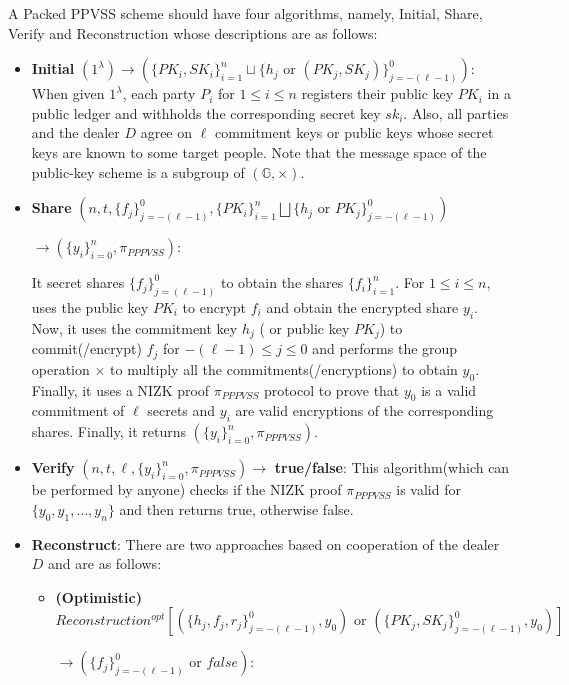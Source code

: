 \begin{definition}
    A Packed PPVSS scheme should have four algorithms, namely, Initial, Share, Verify and Reconstruction whose 
    descriptions are as follows:
    \begin{itemize}
        \item \textbf{Initial} $(1^\lambda)\rightarrow(\{PK_i,SK_i\}_{i=1}^n\sqcup\{h_j\text{ or }(PK_j,SK_j)\}_{j=-(\ell-1)}^0)$: 
          When given $1^\lambda$, each party $P_i$ for $1\leq i\leq n$ registers their public key $PK_i$ in a 
          public ledger and withholds the corresponding secret key $sk_i$. Also, all parties and the dealer $D$ 
          agree on $\ell$ commitment keys or public keys whose secret keys are known to some target people. 
          Note that the message space of the public-key scheme is a subgroup of $(\mathbb{G},\times)$.
        \item \textbf{Share} $(n,t,\{f_j\}_{j=-(\ell-1)}^0,\{PK_i\}_{i=1}^n\bigsqcup\{h_j\text{ or }PK_j\}_{j=-(\ell-1)}^0)$\par$\rightarrow(\{y_i\}_{i=0}^n,\pi_{PPPVSS})$:\par 
          It secret shares $\{f_j\}_{j=(\ell-1)}^0$ to obtain the shares $\{f_i\}_{i=1}^n$. For $1\leq i\leq n$, uses 
          the public key $PK_i$ to encrypt $f_i$ and obtain the encrypted share $y_i$. Now, it uses the commitment 
          key $h_j$ ( or public key $PK_j$) to commit(/encrypt) $f_j$ for $-(\ell-1)\leq j\leq0$ and performs the 
          group operation $\times$ to multiply all the commitments(/encryptions) to obtain $y_0$. 
          Finally, it uses a NIZK proof $\pi_{PPPVSS}$ protocol to prove that $y_0$ is a valid commitment of $\ell$ 
          secrets and $y_i$ are valid encryptions of the corresponding shares. Finally, it returns $(\{y_i\}_{i=0}^n,\pi_{PPPVSS})$.
        \item \textbf{Verify} $(n,t,\ell,\{y_i\}_{i=0}^n,\pi_{PPPVSS})\rightarrow$ \textbf{true/false}: 
          This algorithm(which can be performed by anyone) checks if the NIZK proof $\pi_{PPPVSS}$ is valid for 
          $\{y_0,y_1,\dots,y_n\}$ and then returns true, otherwise false.
        \item \textbf{Reconstruct}: There are two approaches based on cooperation of the dealer $D$ and are as follows:
          \begin{itemize}
            \item \textbf{(Optimistic)} $Reconstruction^{opt}[(\{h_j,f_j,r_j\}_{j=-(\ell-1)}^0,y_0)\text{ or }(\{PK_j,SK_j\}_{j=-(\ell-1)}^0,y_0)]$\par$\rightarrow(\{f_j\}_{j=-(\ell-1)}^0\text{ or }false)$:

\end{itemize}
\end{itemize}
\end{definition}
